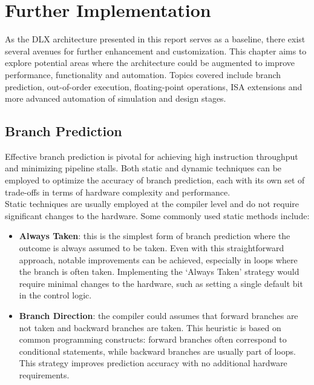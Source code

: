 \chapter{Further Implementation}
\label{chap:08_further_implementation}

As the DLX architecture presented in this report serves as a baseline, there exist several avenues for further enhancement and customization. This chapter aims to explore potential areas where the architecture could be augmented to improve performance, functionality and automation. Topics covered include branch prediction, out-of-order execution, floating-point operations, ISA extensions and more advanced automation of simulation and design stages.

\section{Branch Prediction}
Effective branch prediction is pivotal for achieving high instruction throughput and minimizing pipeline stalls. Both static and dynamic techniques can be employed to optimize the accuracy of branch prediction, each with its own set of trade-offs in terms of hardware complexity and performance. \\

Static techniques are usually employed at the compiler level and do not require significant changes to the hardware. Some commonly used static methods include:

\begin{itemize}
    \item \textbf{Always Taken}: this is the simplest form of branch prediction where the outcome is always assumed to be taken. Even with this straightforward approach, notable improvements can be achieved, especially in loops where the branch is often taken. Implementing the `Always Taken' strategy would require minimal changes to the hardware, such as setting a single default bit in the control logic.
    
    \item \textbf{Branch Direction}: the compiler could assumes that forward branches are not taken and backward branches are taken. This heuristic is based on common programming constructs: forward branches often correspond to conditional statements, while backward branches are usually part of loops. This strategy improves prediction accuracy with no additional hardware requirements.
\end{itemize}

